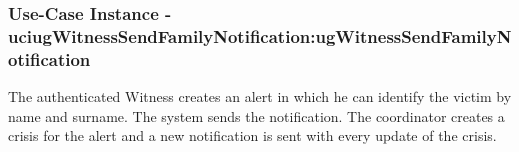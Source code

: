 
	\subsubsection{Use-Case Instance - uciugWitnessSendFamilyNotification:ugWitnessSendFamilyNotification}
	
	The authenticated Witness creates an alert in which he can identify the victim by name and surname. 
	The system sends the notification. The coordinator creates a crisis for the alert and a new notification is sent
	with every update of the crisis.		  
	\begin{operationmodel}
	
	\end{operationmodel} 

	
